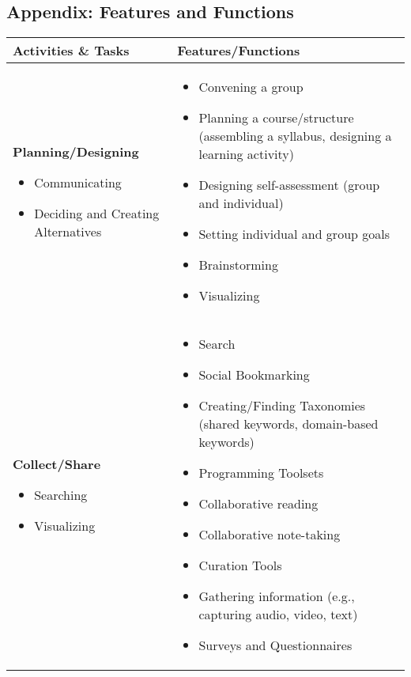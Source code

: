 \newpage
\subsection{Appendix: Features and Functions}
\centering
{\Tiny
\begin{tabular}{|p{}p{}@{\hspace{.2in}}|}
\hline 
\textbf{\small Activities \& Tasks} & \textbf{\small Features/Functions}\\
\hline 
\textbf{Planning/Designing}
\begin{itemize}[noitemsep]
\item
  Communicating
\item
  Deciding and Creating Alternatives
\end{itemize} &
\begin{itemize}[noitemsep]
\item
  Convening a group
\item
  Planning a course/structure (assembling a syllabus, designing a
  learning activity)
\item
  Designing self-assessment (group and individual)
\item
  Setting individual and group goals
\item
  Brainstorming
\item
  Visualizing
\end{itemize} \\
\textbf{Collect/Share}
\begin{itemize}[noitemsep]
\item
  Searching
\item
  Visualizing
\end{itemize} &
\begin{itemize}[noitemsep]
\item
  Search
\item
  Social Bookmarking
\item
  Creating/Finding Taxonomies (shared keywords, domain-based keywords)
\item
  Programming Toolsets
\item
  Collaborative reading
\item
  Collaborative note-taking
\item
  Curation Tools
\item
  Gathering information (e.g., capturing audio, video, text)
\item
  Surveys and Questionnaires
\end{itemize} \\

\end{tabular}}
